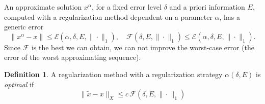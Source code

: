 \documentclass[10pt, a4paper, twoside, openright]{book}
\theoremstyle{definition}
\newtheorem{definition}[subsection]{Definition}
\theoremstyle{plain}
\theoremstyle{plain}
\theoremstyle{plain}
\theoremstyle{plain}
\theoremstyle{plain}
\theoremstyle{plain}
\theoremstyle{plain}
\theoremstyle{plain}
\begin{document}
An approximate solution $x^\alpha$, for a fixed error level $\delta$ and a priori information $E$, computed with a regularization method dependent on a parameter $\alpha$, has a generic error
\begin{equation}
 \|x^\alpha -x\| \leq \mathcal{E}(\alpha, \delta, E, \|\cdot\|_1), \quad \mathcal{F}(\delta, E, \|\cdot\|_1)\leq\mathcal{E}(\alpha, \delta, E, \|\cdot\|_1).
\end{equation}
Since $\mathcal{F}$ is the best we can obtain, we can not improve the worst-case error (the error of the worst approximating sequence).
\begin{definition}
A regularization method with a regularization strategy $\alpha(\delta, E)$ is \emph{optimal} if 
\begin{equation}
 \|\tilde{x} - x\|_X \leq c\,\mathcal{F}(\delta, E, \|\cdot\|_1)
\end{equation}
\end{definition}
\end{document}
